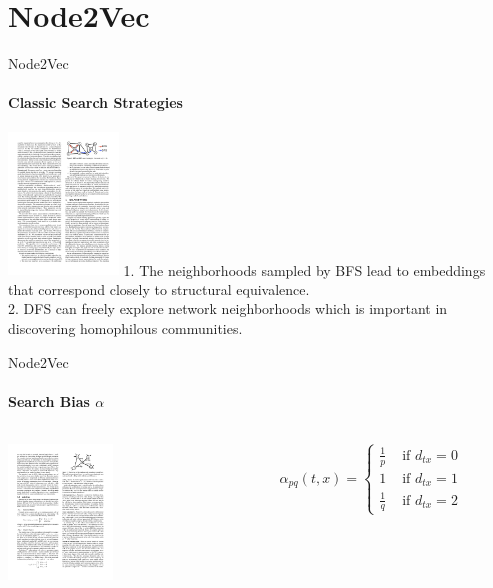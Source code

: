 \documentclass{beamer}
\begin{document}
\section{Node2Vec}
\begin{frame}{Node2Vec}
    \framesubtitle{Classic Search Strategies}
    \centering\includegraphics[height=3.8cm]{node2vec_1.pdf}
    1. The neighborhoods sampled by BFS lead to embeddings that correspond closely to structural equivalence.\\
    2. DFS can freely explore network neighborhoods which is important in discovering homophilous communities.
\end{frame}
\begin{frame}{Node2Vec}
    \framesubtitle{Search Bias $\alpha$ }
    \begin{columns}
        \begin{column}{0.5\textwidth}
            \centering\includegraphics[height=3.6cm]{node2vec_2.pdf}
        \end{column}
        \begin{column}{0.5\textwidth}
            $$
            \alpha_{p q}(t, x)= \begin{cases}\frac{1}{p} & \text { if } d_{t x}=0 \\ 1 & \text { if } d_{t x}=1 \\ \frac{1}{q} & \text { if } d_{t x}=2\end{cases}
            $$
        \end{column}
    \end{columns}
\end{frame}
\end{document}
